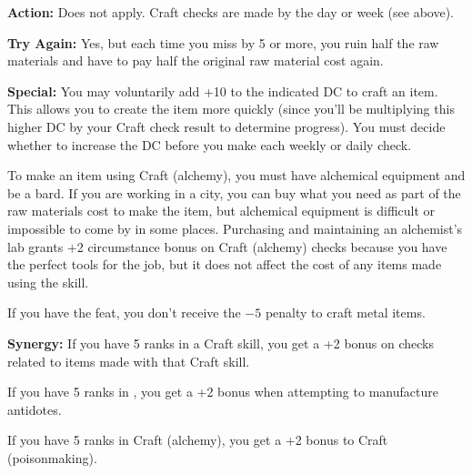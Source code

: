\textbf{Action:} Does not apply. Craft checks are made by the day or week (see above).

\textbf{Try Again:} Yes, but each time you miss by 5 or more, you ruin half the raw materials and have to pay half the original raw material cost again.

\textbf{Special:} You may voluntarily add +10 to the indicated DC to craft an item. This allows you to create the item more quickly (since you'll be multiplying this higher DC by your Craft check result to determine progress). You must decide whether to increase the DC before you make each weekly or daily check.

To make an item using Craft (alchemy), you must have alchemical equipment and be a bard. If you are working in a city, you can buy what you need as part of the raw materials cost to make the item, but alchemical equipment is difficult or impossible to come by in some places. Purchasing and maintaining an alchemist's lab grants +2 circumstance bonus on Craft (alchemy) checks because you have the perfect tools for the job, but it does not affect the cost of any items made using the skill.

If you have the  feat, you don't receive the $-5$ penalty to craft metal items.

\textbf{Synergy:} If you have 5 ranks in a Craft skill, you get a +2 bonus on  checks related to items made with that Craft skill.

If you have 5 ranks in , you get a +2 bonus when attempting to manufacture antidotes.

If you have 5 ranks in Craft (alchemy), you get a +2 bonus to Craft (poisonmaking).